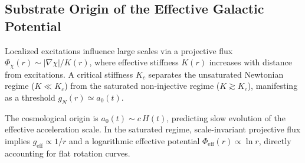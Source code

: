 \subsection{Substrate Origin of the Effective Galactic Potential}
  \label{app:substrate-origin-phi-eff}

  Localized excitations influence large scales via a projective flux
  $\Phi_\chi(r) \sim |\nabla\chi|/K(r)$, where effective stiffness $K(r)$
  increases with distance from excitations.
  A critical stiffness $K_c$ separates the unsaturated Newtonian regime
  ($K \ll K_c$) from the saturated non-injective regime
  ($K \gtrsim K_c$), manifesting as a threshold
  $g_N(r) \simeq a_0(t)$.

  The cosmological origin is
  $a_0(t) \sim c\,H(t)$, predicting slow evolution of the effective
  acceleration scale.
  In the saturated regime, scale-invariant projective flux implies
  $g_{\mathrm{eff}} \propto 1/r$ and a logarithmic effective potential
  $\Phi_{\mathrm{eff}}(r) \propto \ln r$, directly accounting for flat
  rotation curves.
